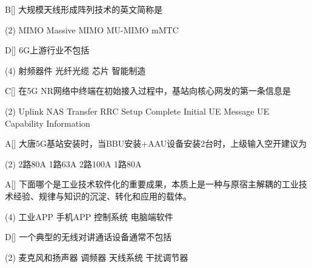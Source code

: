\begin{choice}{B}[]
    大规模天线形成阵列技术的英文简称是
    \begin{tasks}(2)
        \task MIMO
        \task Massive MIMO
        \task MU-MIMO
        \task mMTC
    \end{tasks}
\end{choice}


\begin{choice}{D}[]
    6G上游行业不包括
    \begin{tasks}(4)
        \task 射频器件
        \task 光纤光缆
        \task 芯片
        \task 智能制造
    \end{tasks}
\end{choice}


\begin{choice}{C}[]
    在5G NR网络中终端在初始接入过程中，基站向核心网发的第一条信息是
    \begin{tasks}(2)
        \task Uplink NAS Transfer
        \task RRC Setup Complete
        \task Initial UE Message
        \task UE Capability Information
    \end{tasks}
\end{choice}



\begin{choice}{A}[]
    大唐5G基站安装时，当BBU安装+AAU设备安装2台时，上级输入空开建议为
    \begin{tasks}(2)
        \task 2路80A
        \task 1路63A
        \task 2路100A
        \task 1路80A
    \end{tasks}
\end{choice}


\begin{choice}{A}[]
    下面哪个是工业技术软件化的重要成果，本质上是一种与原宿主解耦的工业技术经验、规律与知识的沉淀、转化和应用的载体。
    \begin{tasks}(4)
        \task 工业APP
        \task 手机APP
        \task 控制系统
        \task 电脑端软件
    \end{tasks}
\end{choice}


\begin{choice}{D}[]
    一个典型的无线对讲通话设备通常不包括
    \begin{tasks}(2)
        \task 麦克风和扬声器
        \task 调频器
        \task 天线系统
        \task 干扰调节器
    \end{tasks}
\end{choice}


